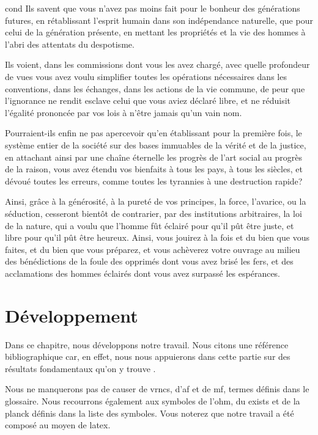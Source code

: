 \documentclass[12pt,space=onehalf,version=final]{yathesis}
\begin{document}
\begin{displaycquote}[pp.~509-511]{cond}
  Ils savent que vous n'avez pas moins fait pour le bonheur des
  générations futures, en rétablissant l'esprit humain dans son
  indépendance naturelle, que pour celui de la génération présente, en
  mettant les propriétés et la vie des hommes à l'abri des attentats
  du despotisme.

  Ils voient, dans les commissions dont vous les avez chargé, avec
  quelle profondeur de vues vous avez voulu simplifier toutes les
  opérations nécessaires dans les conventions, dans les échanges, dans
  les actions de la vie commune, de peur que l'ignorance ne rendit
  esclave celui que vous aviez déclaré libre, et ne réduisit l'égalité
  prononcée par vos lois à n'être jamais qu'un vain nom.

  Pourraient-ils enfin ne pas apercevoir qu'en établissant pour la
  première fois, le système entier de la société sur des bases
  immuables de la vérité et de la justice, en attachant ainsi par une
  chaîne éternelle les progrès de l'art social au progrès de la
  raison, vous avez étendu vos bienfaits à tous les pays, à tous les
  siècles, et dévoué toutes les erreurs, comme toutes les tyrannies à
  une destruction rapide?

  Ainsi, grâce à la générosité, à la pureté de vos principes, la
  force, l'avarice, ou la séduction, cesseront bientôt de contrarier,
  par des institutions arbitraires, la loi de la nature, qui a voulu
  que l'homme fût éclairé pour qu'il pût être juste, et libre pour
  qu'il pût être heureux. Ainsi, vous jouirez à la fois et du bien que
  vous faites, et du bien que vous préparez, et vous achèverez votre
  ouvrage au milieu des bénédictions de la foule des opprimés dont
  vous avez brisé les fers, et des acclamations des hommes éclairés
  dont vous avez surpassé les espérances.
\end{displaycquote}
%
\chapter{Développement}
\label{chap-developpement}

Dans ce chapitre, nous développons notre travail. Nous citons une
référence
bibliographique \autocite{relativite}
car, en effet, nous nous appuierons dans cette partie sur des
résultats fondamentaux qu'on y trouve
\autocite[chap.~3]{relativite}.

Nous ne manquerons pas de causer de \glspl{vrnc}, d'\gls{af} et de \gls{mf},
termes définis dans le glossaire. Nous recourrons également aux
symboles de l'\gls{ohm}, du \gls{exists} et de la \gls{planck} définis dans la
liste des symboles. Vous noterez que notre travail a été composé au moyen de
\gls{latex}.
\end{document}
